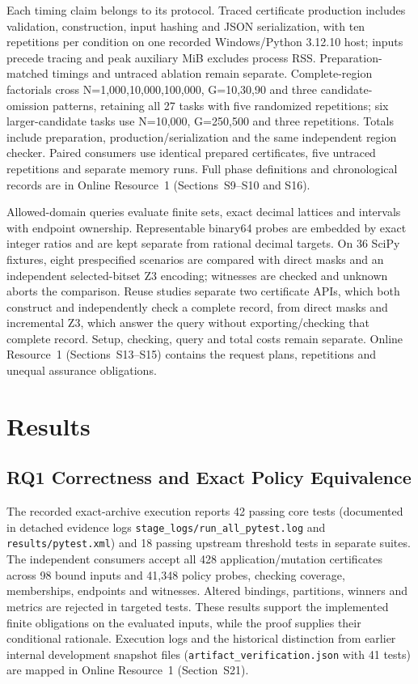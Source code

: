 \documentclass[11pt,a4paper]{article}
\begin{document}
Each timing claim belongs to its protocol. Traced certificate production includes validation, construction, input hashing and JSON serialization, with ten repetitions per condition on one recorded Windows/Python 3.12.10 host; inputs precede tracing and peak auxiliary MiB excludes process RSS. Preparation-matched timings and untraced ablation remain separate. Complete-region factorials cross N={1{,}000,10{,}000,100{,}000}, G={10,30,90} and three candidate-omission patterns, retaining all 27 tasks with five randomized repetitions; six larger-candidate tasks use N=10{,}000, G={250,500} and three repetitions. Totals include preparation, production/serialization and the same independent region checker. Paired consumers use identical prepared certificates, five untraced repetitions and separate memory runs. Full phase definitions and chronological records are in Online Resource~1 (Sections~S9--S10 and S16).

Allowed-domain queries evaluate finite sets, exact decimal lattices and intervals with endpoint ownership. Representable binary64 probes are embedded by exact integer ratios and are kept separate from rational decimal targets. On 36 SciPy fixtures, eight prespecified scenarios are compared with direct masks and an independent selected-bitset Z3 encoding; witnesses are checked and unknown aborts the comparison. Reuse studies separate two certificate APIs, which both construct and independently check a complete record, from direct masks and incremental Z3, which answer the query without exporting/checking that complete record. Setup, checking, query and total costs remain separate. Online Resource~1 (Sections~S13--S15) contains the request plans, repetitions and unequal assurance obligations.


\section{Results}


\subsection{RQ1 Correctness and Exact Policy Equivalence}\label{subsec:rq1}

The recorded exact-archive execution reports 42 passing core tests (documented in detached evidence logs \texttt{stage\_logs/\allowbreak run\_all\_pytest.log} and \texttt{results/\allowbreak pytest.xml}) and 18 passing upstream threshold tests in separate suites. The independent consumers accept all 428 application/mutation certificates across 98 bound inputs and 41{,}348 policy probes, checking coverage, memberships, endpoints and witnesses. Altered bindings, partitions, winners and metrics are rejected in targeted tests. These results support the implemented finite obligations on the evaluated inputs, while the proof supplies their conditional rationale. Execution logs and the historical distinction from earlier internal development snapshot files (\texttt{artifact\_verification.json} with 41 tests) are mapped in Online Resource~1 (Section~S21).
\end{document}
